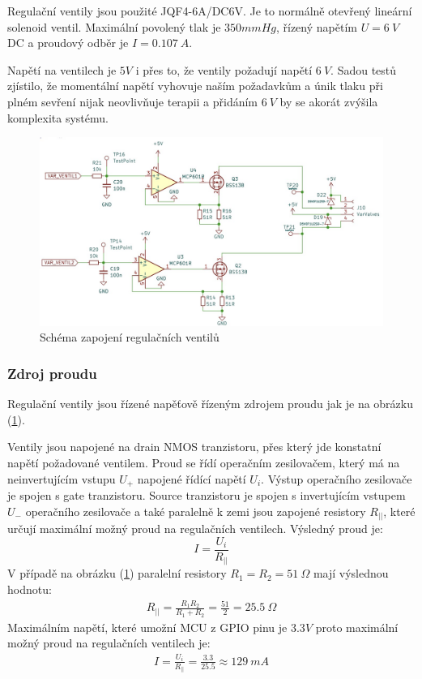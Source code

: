 Regulační ventily jsou použité JQF4-6A/DC6V. Je to normálně otevřený lineární solenoid ventil. Maximální povolený tlak je $350mmHg$, řízený napětím $U = 6 \ V$ DC a proudový odběr je $I = 0.107 \ A$.\par

Napětí na ventilech je $5V$ i přes to, že ventily požadují napětí $6 \ V$. Sadou testů zjístilo, že momentální napětí vyhovuje naším požadavkům a únik tlaku při plném sevření nijak neovlivňuje terapii a přidáním $6 \ V$ by se akorát zvýšila komplexita systému.

\begin{figure}[H]
    \includegraphics[width=1\linewidth]{pictures/var_valves.jpg}
    \caption{Schéma zapojení regulačních ventilů}
    \label{fig:variable_valve_driver}
\end{figure}

\subsubsection{Zdroj proudu}
Regulační ventily jsou řízené napěťově řízeným zdrojem proudu jak je na obrázku (\ref{fig:variable_valve_driver}).\par
Ventily jsou napojené na drain NMOS tranzistoru, přes který jde konstatní napětí požadované ventilem. Proud se řídí operačním zesilovačem, který má na neinvertujícím vstupu $U_+$ napojené řídící napětí $U_i$. Výstup operačního zesilovače je spojen s gate tranzistoru. Source tranzistoru je spojen s invertujícím vstupem $U_-$ operačního zesilovače a také paralelně k zemi jsou zapojené resistory $R_{||}$, které určují maximální možný proud na regulačních ventilech. Výsledný proud je:
\begin{equation}
    \label{eq:current_source}
    I = \frac{U_i}{R_{||}}
\end{equation}
V případě na obrázku (\ref{fig:variable_valve_driver}) paralelní resistory $R_1 = R_2 = 51 \ \Omega$ mají výslednou hodnotu:
\begin{align*}
    R_{||} = \frac{R_1 R_2}{R_1 + R_2} = \frac{51}{2} = 25.5 \ \Omega
\end{align*}
Maximálním napětí, které umožní MCU z GPIO pinu je $3.3V$ proto maximální možný proud na regulačních ventilech je:
\begin{align*}
    I = \frac{U_i}{R_{||}} = \frac{3.3}{25.5} \approx 129 \ mA
\end{align*}


